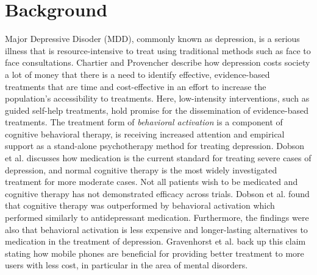 \section{Background}


Major Depressive Disoder (MDD), commonly known as depression, is a serious illness that is resource-intensive to treat using traditional methods such as face to face consultations. Chartier and Provencher \cite{behavioural_activation_for_depression} describe how depression costs society a lot of money that there is a need to identify effective, evidence-based treatments that are time and cost-effective in an effort to increase the population's accessibility to treatments. Here, low-intensity interventions, such as guided self-help treatments, hold promise for the dissemination of evidence-based treatments. The treatment form of \textit{behavioral activation} is a component of cognitive behavioral therapy, is receiving increased attention and empirical support as a stand-alone psychotherapy method for treating depression. Dobson et al. \cite{randomized_trial_behavioural_activation} discusses how medication is the current standard for treating severe cases of depression, and normal cognitive therapy is the most widely investigated treatment for more moderate cases. Not all patients wish to be medicated and cognitive therapy has not demonstrated efficacy across trials. Dobson et al. found that cognitive therapy was outperformed by behavioral activation which performed similarly to antidepressant medication. Furthermore, the findings were also that behavioral activation is less expensive and longer-lasting alternatives to medication in the treatment of depression. Gravenhorst et al. \cite{Gravenhorst2015} back up this claim stating how mobile phones are beneficial for providing better treatment to more users with less cost, in particular in the area of mental disorders. \\

